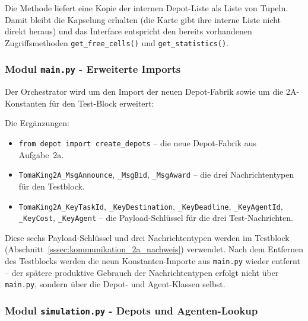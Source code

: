 Die Methode liefert eine Kopie der internen Depot-Liste als Liste von Tupeln. Damit bleibt die Kapselung erhalten (die Karte gibt ihre interne Liste nicht direkt heraus) und das Interface entspricht den bereits vorhandenen Zugriffsmethoden \texttt{get\_free\_cells()} und \texttt{get\_statistics()}.


\subsubsection{Modul \texttt{main.py} - Erweiterte Imports}

Der Orchestrator wird um den Import der neuen Depot-Fabrik sowie um die 2A-Konstanten für den Test-Block erweitert:



Die Ergänzungen:
\begin{itemize}
    \item \texttt{from depot import create\_depots} -- die neue Depot-Fabrik aus Aufgabe~2a.
    \item \texttt{TomaKing2A\_MsgAnnounce}, \texttt{\_MsgBid}, \texttt{\_MsgAward} -- die drei Nachrichtentypen für den Testblock.
    \item \texttt{TomaKing2A\_KeyTaskId}, \texttt{\_KeyDestination}, \texttt{\_KeyDeadline}, \texttt{\_KeyAgentId}, \texttt{\_KeyCost}, \texttt{\_KeyAgent} -- die Payload-Schlüssel für die drei Test-Nachrichten.
\end{itemize}

Diese sechs Payload-Schlüssel und drei Nachrichtentypen werden im Testblock (Abschnitt~\ref{sssec:kommunikation_2a_nachweis}) verwendet. Nach dem Entfernen des Testblocks werden die neun Konstanten-Importe aus \texttt{main.py} wieder entfernt -- der spätere produktive Gebrauch der Nachrichtentypen erfolgt nicht über \texttt{main.py}, sondern über die Depot- und Agent-Klassen selbst.


\subsubsection{Modul \texttt{simulation.py} - Depots und Agenten-Lookup}

